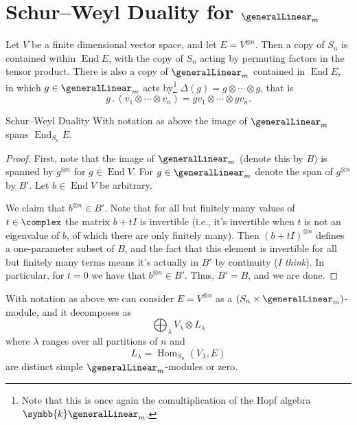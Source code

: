 \documentclass[fleqn]{NotesClass}
\renewcommand{\field}{\symbb{k}}
\DeclareMathOperator{\End}{End}
\DeclareMathOperator{\Hom}{Hom}
\newcommand{\action}{\mathbin{.}}
\begin{document}
    \section{Schur--Weyl Duality for \texorpdfstring{\(\generalLinear_m\)}{GLm}}
    
    Let \(V\) be a finite dimensional vector space, and let \(E = V^{\otimes n}\).
    Then a copy of \(S_n\) is contained within \(\End E\), with the copy of \(S_n\) acting by permuting factors in the tensor product.
    There is also a copy of \(\generalLinear_m\) contained in \(\End E\), in which \(g \in \generalLinear_m\) acts by\footnote{Note that this is once again the comultiplication of the Hopf algebra \(\field \generalLinear_m\).} \(\Delta(g) = g \otimes \dotsb \otimes g\), that is
    \begin{equation}
        g \action (v_1 \otimes \dotsb \otimes v_n) = gv_1 \otimes \dotsb \otimes gv_n.
    \end{equation}
    
    \begin{thm}{Schur--Weyl Duality}{}
        With notation as above the image of \(\generalLinear_m\) spans \(\End_{S_n} E\).
        \begin{proof}
            First, note that the image of \(\generalLinear_m\) (denote this by \(B\)) is spanned by \(g^{\otimes n}\) for \(g \in \End V\).
            For \(g \in \generalLinear_m\) denote the span of \(g^{\otimes n}\) by \(B'\).
            Let \(b \in \End V\) be arbitrary.
            
            We claim that \(b^{\otimes n} \in B'\).
            Note that for all but finitely many values of \(t \in \complex\) the matrix \(b + tI\) is invertible (i.e., it's invertible when \(t\) is not an eigenvalue of \(b\), of which there are only finitely many).
            Then \((b + tI)^{\otimes n}\) defines a one-parameter subset of \(B\), and the fact that this element is invertible for all but finitely many terms means it's actually in \(B'\) by continuity (\emph{I think}).
            In particular, for \(t = 0\) we have that \(b^{\otimes n} \in B'\).
            Thus, \(B' = B\), and we are done.
        \end{proof}
    \end{thm}
    
    \begin{crl}{}{}
        With notation as above we can consider \(E = V^{\otimes n}\) as a \((S_n \times \generalLinear_m)\)-module, and it decomposes as
        \begin{equation}
            \bigoplus_\lambda V_\lambda \otimes L_\lambda
        \end{equation}
        where \(\lambda\) ranges over all partitions of \(n\) and
        \begin{equation}
            L_\lambda = \Hom_{S_n}(V_\lambda, E)
        \end{equation}
        are distinct simple \(\generalLinear_m\)-modules or zero.
    \end{crl}
    
\end{document}
